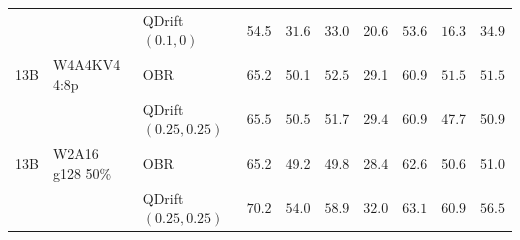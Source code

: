 \begin{tabular}{lllccccccc}
 &  & QDrift $(0.1, 0)$ & 54.5 & $\mathbf{31.6}$ & $\mathbf{33.0}$ & 20.6 & $\mathbf{53.6}$ & $\mathbf{16.3}$ & $\mathbf{34.9}$ \\
13B & W4A4KV4 4:8p & OBR & 65.2 & 50.1 & $\mathbf{52.5}$ & 29.1 & 60.9 & $\mathbf{51.5}$ & $\mathbf{51.5}$ \\
 &  & QDrift $(0.25, 0.25)$ & $\mathbf{65.5}$ & $\mathbf{50.5}$ & 51.7 & $\mathbf{29.4}$ & 60.9 & 47.7 & 50.9 \\
13B & W2A16 g128 50\% & OBR & 65.2 & 49.2 & 49.8 & 28.4 & 62.6 & 50.6 & 51.0 \\
 &  & QDrift $(0.25, 0.25)$ & $\mathbf{70.2}$ & $\mathbf{54.0}$ & $\mathbf{58.9}$ & $\mathbf{32.0}$ & $\mathbf{63.1}$ & $\mathbf{60.9}$ & $\mathbf{56.5}$ \\
\bottomrule
\end{tabular}
